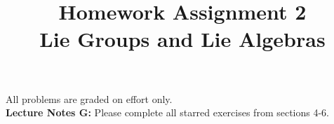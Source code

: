 \documentclass[12pt]{article}
\begin{document}
\date{\vspace{-5ex}}

\title{Homework Assignment 2 \\ Lie Groups and Lie Algebras}

\maketitle

\noindent
All problems are graded on effort only.\\

\noindent
{\bf Lecture Notes G:} Please complete all starred exercises from
sections 4-6.\\
\end{document}

